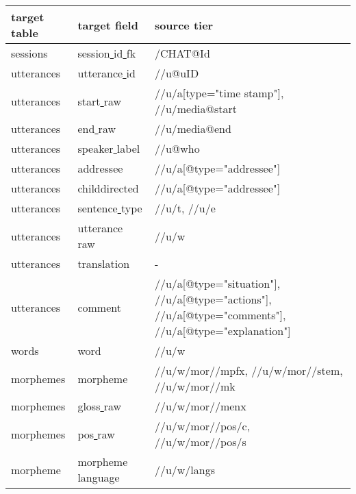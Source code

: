 \documentclass[a4paper, 11pt]{book}
\newcommand{\und}{\underline{{ }}\hspace{0.2mm}}	%
\begin{document}
\begin{table}[ht!]
	\centering
	\begin{tabular}{lll}
		\toprule
			\textbf{target table} & \textbf{target field} & \textbf{source tier} \\
		\midrule
			sessions 	& session\und id\und fk 	& /CHAT@Id \\
			utterances 	& utterance\und id	& //u@uID \\
			utterances 	& start\und raw		& //u/a[type="time stamp"], //u/media@start \\
			utterances 	& end\und raw		& //u/media@end \\
			utterances 	& speaker\und label	& //u@who \\
			utterances 	& addressee			& //u/a[@type="addressee"] \\
			utterances 	& childdirected		& //u/a[@type="addressee"] \\
			utterances 	& sentence\und type	& //u/t, //u/e \\
			utterances 	& utterance\und raw	& //u/w \\ %
			utterances 	& translation		& - \\
			utterances 	& comment			& //u/a[@type="situation"], //u/a[@type="actions"], //u/a[@type="comments"], //u/a[@type="explanation"] \\

			words	 	& word		& //u/w \\
			morphemes	& morpheme			& //u/w/mor//mpfx, //u/w/mor//stem, //u/w/mor//mk \\ %
			morphemes	& gloss\und raw		& //u/w/mor//menx \\ %
			morphemes	& pos\und raw		& //u/w/mor//pos/c, //u/w/mor//pos/s \\ %
			morpheme	& morpheme\und language			& //u/w/langs \\


\end{tabular}
\end{table}
\end{document}
